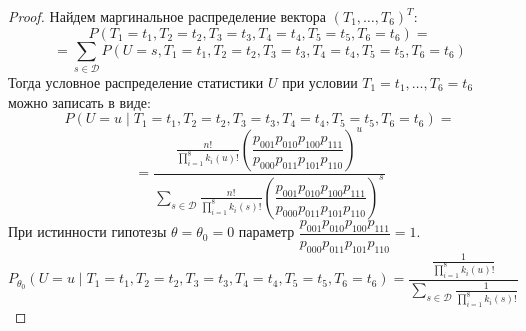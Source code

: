     \begin{proof}
        Найдем маргинальное распределение вектора $(T_1,\ldots,T_6)^T$:
        $$P(T_1=t_1, T_2=t_2, T_3=t_3, T_4=t_4, T_5=t_5, T_6=t_6)=$$
        $$=\sum_{s\in \mathcal{D}} P(U=s, T_1=t_1, T_2=t_2, T_3=t_3, T_4=t_4, T_5=t_5, T_6=t_6)$$
        Тогда условное распределение статистики $U$ при условии $T_1=t_1,\ldots,T_6=t_6$ можно записать в виде:
        $$P(U=u \mid T_1=t_1, T_2=t_2, T_3=t_3, T_4=t_4, T_5=t_5, T_6=t_6)=$$
        $$=\dfrac{\frac{n!}{\prod_{i=1}^8 k_i(u)!} \left(\dfrac{p_{001}p_{010}p_{100}p_{111}}{p_{000}p_{011}p_{101}p_{110}}\right)^u}
            {\sum_{s\in \mathcal{D}} \frac{n!}{\prod_{i=1}^8 k_i(s)!} \left(\dfrac{p_{001}p_{010}p_{100}p_{111}}{p_{000}p_{011}p_{101}p_{110}}\right)^s}$$
        При истинности гипотезы $\theta=\theta_0=0$ параметр $\dfrac{p_{001}p_{010}p_{100}p_{111}}{p_{000}p_{011}p_{101}p_{110}}=1$.
        $$P_{\theta_0}(U=u \mid T_1=t_1, T_2=t_2, T_3=t_3, T_4=t_4, T_5=t_5, T_6=t_6)=\dfrac{\frac{1}{\prod_{i=1}^8 k_i(u)!}}
            {\sum_{s\in \mathcal{D}} \frac{1}{\prod_{i=1}^8 k_i(s)!}}$$
    \end{proof}
    
